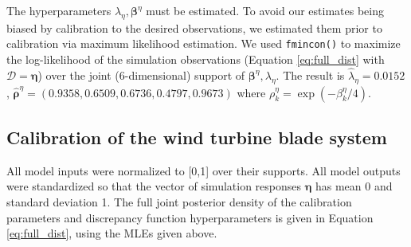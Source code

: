 \documentclass[12pt]{article}
\begin{document}
The hyperparameters $\lambda_\eta,\boldsymbol \beta^\eta$ must be estimated.
% 
To avoid our estimates being biased by calibration to the desired observations, we estimated them prior to calibration via maximum likelihood estimation.
% 
%
We used \texttt{fmincon()} \citep{MATLAB2017} %
to maximize the log-likelihood of the simulation observations  (Equation \eqref{eq:full_dist} with $\mathcal D=\boldsymbol\eta$) over the joint (6-dimensional) support of $\boldsymbol \beta^\eta,\lambda_\eta$.  
%
The result is $\hat\lambda_\eta = 0.0152$, $\boldsymbol {\hat\rho}^\eta = (0.9358, 0.6509, 0.6736, 0.4797, 0.9673)$
where $\rho^\eta_k = \exp(-\beta_k^\eta/4)$. 

\subsection{Calibration of the wind turbine blade system}\label{the_model}
%
All model inputs were normalized to [0,1] over their supports. 
%
All model outputs were standardized so that the vector of simulation responses $\boldsymbol\eta$ has mean 0 and standard deviation 1.
%
The full joint posterior density of the calibration parameters and discrepancy function hyperparameters is given in Equation \eqref{eq:full_dist}, using the MLEs given above.
%
\end{document}
